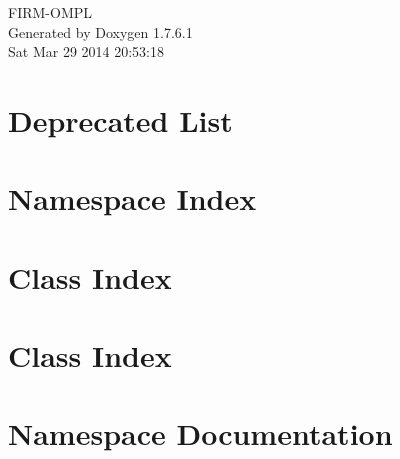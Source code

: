 \documentclass[a4paper]{book}
\begin{document}
\hypersetup{pageanchor=false,citecolor=blue}
\begin{titlepage}
\vspace*{7cm}
\begin{center}
{\Large \-F\-I\-R\-M-\/\-O\-M\-P\-L }\\
\vspace*{1cm}
{\large \-Generated by Doxygen 1.7.6.1}\\
\vspace*{0.5cm}
{\small Sat Mar 29 2014 20:53:18}\\
\end{center}
\end{titlepage}
\clearemptydoublepage
{}
\tableofcontents
\clearemptydoublepage
{}
\hypersetup{pageanchor=true,citecolor=blue}
\chapter{\-Deprecated \-List}
\label{deprecated}
\hypertarget{deprecated}{}

\chapter{\-Namespace \-Index}

\chapter{\-Class \-Index}

\chapter{\-Class \-Index}

\chapter{\-Namespace \-Documentation}

\end{document}

